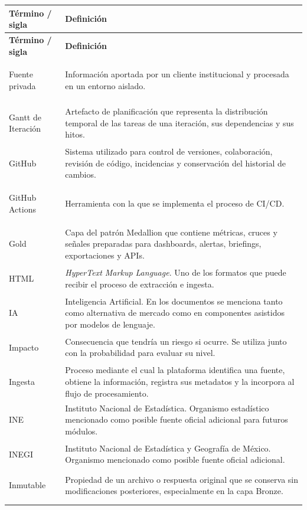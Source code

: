 \documentclass[11pt,a4paper]{article}
\makeatletter
\newenvironment{glosario}{%
  \renewcommand{\arraystretch}{1.18}%
  \begin{longtable}{@{}>{\raggedright\arraybackslash\bfseries}p{4.0cm} >{\raggedright\arraybackslash}p{10.7cm}@{}}
  \toprule
  \textbf{T\'ermino / sigla} & \textbf{Definici\'on} \\
  \midrule
  \endfirsthead
  \toprule
  \textbf{T\'ermino / sigla} & \textbf{Definici\'on} \\
  \midrule
  \endhead
  \bottomrule
  \endfoot
}{%
  \end{longtable}
  \renewcommand{\arraystretch}{1}%
}
\makeatother
\begin{document}
\begin{glosario}
Fuente privada & Informaci\'on aportada por un cliente institucional y procesada en un entorno aislado. \\
\addlinespace

Gantt de Iteraci\'on & Artefacto de planificaci\'on que representa la distribuci\'on temporal de las tareas de una iteraci\'on, sus dependencias y sus hitos. \\
\addlinespace

GitHub & Sistema utilizado para control de versiones, colaboraci\'on, revisi\'on de c\'odigo, incidencias y conservaci\'on del historial de cambios. \\
\addlinespace

GitHub Actions & Herramienta con la que se implementa el proceso de CI/CD. \\
\addlinespace

Gold & Capa del patr\'on Medallion que contiene m\'etricas, cruces y se\~nales preparadas para dashboards, alertas, briefings, exportaciones y APIs. \\
\addlinespace

HTML & \emph{HyperText Markup Language}. Uno de los formatos que puede recibir el proceso de extracci\'on e ingesta. \\
\addlinespace

IA & Inteligencia Artificial. En los documentos se menciona tanto como alternativa de mercado como en componentes asistidos por modelos de lenguaje. \\
\addlinespace

Impacto & Consecuencia que tendr\'ia un riesgo si ocurre. Se utiliza junto con la probabilidad para evaluar su nivel. \\
\addlinespace

Ingesta & Proceso mediante el cual la plataforma identifica una fuente, obtiene la informaci\'on, registra sus metadatos y la incorpora al flujo de procesamiento. \\
\addlinespace

INE & Instituto Nacional de Estad\'istica. Organismo estad\'istico mencionado como posible fuente oficial adicional para futuros m\'odulos. \\
\addlinespace

INEGI & Instituto Nacional de Estad\'istica y Geograf\'ia de M\'exico. Organismo mencionado como posible fuente oficial adicional. \\
\addlinespace

Inmutable & Propiedad de un archivo o respuesta original que se conserva sin modificaciones posteriores, especialmente en la capa Bronze. \\
\addlinespace


\end{glosario}
\end{document}
